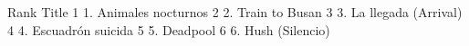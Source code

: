 \begin{Schunk}
\begin{Soutput}
  Rank                Title
1   1.   Animales nocturnos
2   2.       Train to Busan
3   3. La llegada (Arrival)
4   4.    Escuadrón suicida
5   5.             Deadpool
6   6.      Hush (Silencio)
\end{Soutput}
\end{Schunk}
